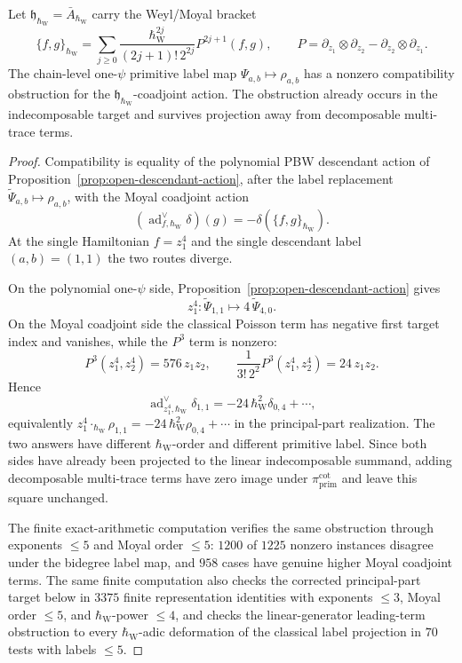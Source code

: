 \begin{prop}
  \label{prop:quantum-descendant-label-obstruction}
  Let \(\mathfrak h_{\hbar_{\mathrm{W}}}=\bar A_{\hbar_{\mathrm{W}}}\) carry the Weyl/Moyal bracket
  \[
    \{f,g\}_{\hbar_{\mathrm{W}}}
    =
    \sum_{j\geq0}
    \frac{\hbar_{\mathrm{W}}^{2j}}{(2j+1)!\,2^{2j}}P^{2j+1}(f,g),
    \qquad
    P=\partial_{z_1}\otimes\partial_{z_2}
      -\partial_{z_2}\otimes\partial_{z_1}.
  \]
	  The chain-level one-\(\psi\) primitive label map
	  \(\Psi_{a,b}\mapsto\rho_{a,b}\) has a nonzero compatibility
	  obstruction for the \(\mathfrak h_{\hbar_{\mathrm{W}}}\)-coadjoint action.  The
	  obstruction already occurs in the indecomposable target and survives
	  projection away from decomposable multi-trace terms.
\end{prop}

\begin{proof}
  Compatibility is equality of the polynomial PBW descendant action
  of Proposition~\ref{prop:open-descendant-action}, after the label
  replacement \(\widetilde\Psi_{a,b}\mapsto\rho_{a,b}\), with
  the Moyal coadjoint action
  \[
    (\operatorname{ad}^{\vee}_{f,\hbar_{\mathrm{W}}}\delta)(g)
    =-\delta(\{f,g\}_{\hbar_{\mathrm{W}}}).
  \]
  At the single Hamiltonian \(f=z_1^4\) and the single descendant label
  \((a,b)=(1,1)\) the two routes diverge.

  On the polynomial one-\(\psi\) side,
  Proposition~\ref{prop:open-descendant-action} gives
  \[
    z_1^4:\widetilde\Psi_{1,1}
    \longmapsto 4\,\widetilde\Psi_{4,0}.
  \]
  On the Moyal coadjoint side the classical Poisson term has negative
  first target index and vanishes, while the \(P^3\) term is nonzero:
  \[
    P^3(z_1^4,z_2^4)=576\,z_1z_2,\qquad
    \frac{1}{3!\,2^2}P^3(z_1^4,z_2^4)=24\,z_1z_2.
  \]
  Hence
  \[
    \operatorname{ad}^{\vee}_{z_1^4,\hbar_{\mathrm{W}}}\delta_{1,1}
    =-24\,\hbar_{\mathrm{W}}^2\delta_{0,4}+\cdots,
  \]
  equivalently
  \(z_1^4\cdot_{\hbar_{\mathrm{W}}}\rho_{1,1}=-24\,\hbar_{\mathrm{W}}^2\rho_{0,4}+\cdots\) in the
  principal-part realization.  The two answers have different
  \(\hbar_{\mathrm{W}}\)-order and different primitive label.  Since both sides have
  already been projected to the linear indecomposable summand, adding
  decomposable multi-trace terms have zero image under
  \(\pi_{\mathrm{prim}}^{\mathrm{cot}}\) and leave this square unchanged.

	  The finite exact-arithmetic computation verifies the same
	  obstruction through exponents \(\leq5\) and Moyal order \(\leq5\):
  \(1200\) of \(1225\) nonzero instances disagree under the bidegree label
  map, and \(958\) cases have genuine higher Moyal coadjoint terms.  The
  same finite computation also checks the corrected principal-part target below in
  \(3375\) finite representation identities with exponents \(\leq3\),
  Moyal order \(\leq5\), and \(\hbar_{\mathrm{W}}\)-power \(\leq4\), and checks the
	  linear-generator leading-term obstruction to every \(\hbar_{\mathrm{W}}\)-adic
	  deformation of the classical label projection in \(70\) tests with
  labels \(\leq5\).
\end{proof}

